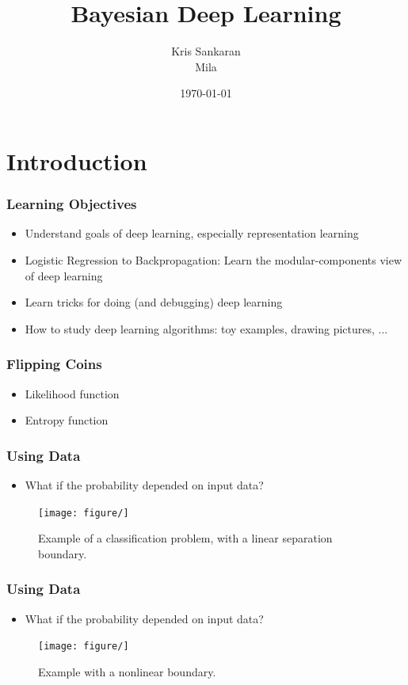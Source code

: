 \documentclass[10pt,mathserif]{beamer}
\title{\large \bfseries Bayesian Deep Learning}
\author{Kris Sankaran\\[3ex] Mila}
\date{\today}
\begin{document}
\maketitle

\section{Introduction}
\label{sec:introduction}

\begin{frame}
  \frametitle{Learning Objectives}
  \begin{itemize}
    \item Understand goals of deep learning, especially representation learning
    \item Logistic Regression to Backpropagation: Learn the modular-components
      view of deep learning
    \item Learn tricks for doing (and debugging) deep learning
    \item How to study deep learning algorithms: toy examples,
      drawing pictures, ...
  \end{itemize}
\end{frame}

\begin{frame}
  \frametitle{Flipping Coins}
  \begin{itemize}
  \item Likelihood function
  \item Entropy function
  \end{itemize} 
\end{frame}

\begin{frame}
  \frametitle{Using Data}
  \begin{itemize}
  \item What if the probability depended on input data?
  \end{itemize}
  \begin{figure}
    \centering
    \texttt{[image: figure/]}
    \caption{Example of a classification problem, with a linear separation
      boundary. \label{fig:logistic_scatter} }
  \end{figure}
\end{frame}

\begin{frame}
  \frametitle{Using Data}
  \begin{itemize}
  \item What if the probability depended on input data?
  \end{itemize}
  \begin{figure}
    \centering
    \texttt{[image: figure/]}
    \caption{Example with a nonlinear
      boundary. \label{fig:logistic_nonlinear_scatter} }
  \end{figure}
\end{frame}
\end{document}
